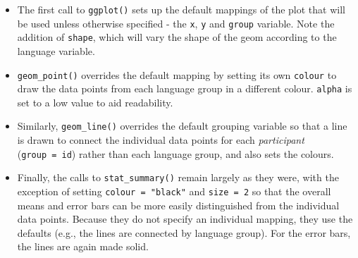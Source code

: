 \documentclass[
  english,
  doc,floatsintext]{apa6}
\providecommand{\tightlist}{%
  \setlength{\itemsep}{0pt}\setlength{\parskip}{0pt}}
\begin{document}
\begin{itemize}
\tightlist
\item
  The first call to \texttt{ggplot()} sets up the default mappings of the plot that will be used unless otherwise specified - the \texttt{x}, \texttt{y} and \texttt{group} variable. Note the addition of \texttt{shape}, which will vary the shape of the geom according to the language variable.
\item
  \texttt{geom\_point()} overrides the default mapping by setting its own \texttt{colour} to draw the data points from each language group in a different colour. \texttt{alpha} is set to a low value to aid readability.
\item
  Similarly, \texttt{geom\_line()} overrides the default grouping variable so that a line is drawn to connect the individual data points for each \emph{participant} (\texttt{group\ =\ id}) rather than each language group, and also sets the colours.\\
\item
  Finally, the calls to \texttt{stat\_summary()} remain largely as they were, with the exception of setting \texttt{colour\ =\ "black"} and \texttt{size\ =\ 2} so that the overall means and error bars can be more easily distinguished from the individual data points. Because they do not specify an individual mapping, they use the defaults (e.g., the lines are connected by language group). For the error bars, the lines are again made solid.
\end{itemize}
\end{document}

